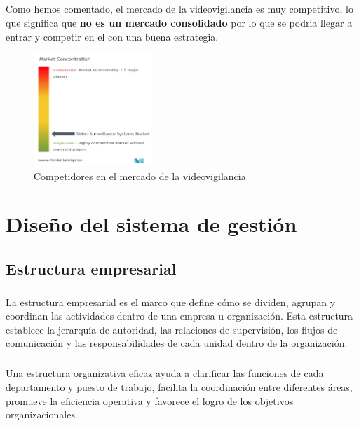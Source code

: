 \documentclass{report}
\begin{document}
        \paragraph*{}{Como hemos comentado, el mercado de la videovigilancia es muy competitivo, lo que significa que \textbf{no es un mercado consolidado} por lo que se podria llegar a entrar y competir en el con una buena estrategia.}
        \begin{figure}[H]
          \centering
          \includegraphics[width=0.4\textwidth]{./img/competidores.png}
          \caption{Competidores en el mercado de la videovigilancia}
        \end{figure}
    \chapter{Diseño del sistema de gestión}
        \section{Estructura empresarial}
          \paragraph*{}{
            La estructura empresarial es el marco que define cómo se dividen, agrupan y coordinan las actividades dentro de una empresa u organización. 
            Esta estructura establece la jerarquía de autoridad, las relaciones de supervisión, los flujos de comunicación y las responsabilidades de cada unidad dentro de la organización.
          }
          \paragraph*{}
          {
            Una estructura organizativa eficaz ayuda a clarificar las funciones de cada departamento y puesto de trabajo, facilita la coordinación entre diferentes áreas, promueve la eficiencia operativa y favorece el logro de los objetivos organizacionales.
          }
\end{document}
